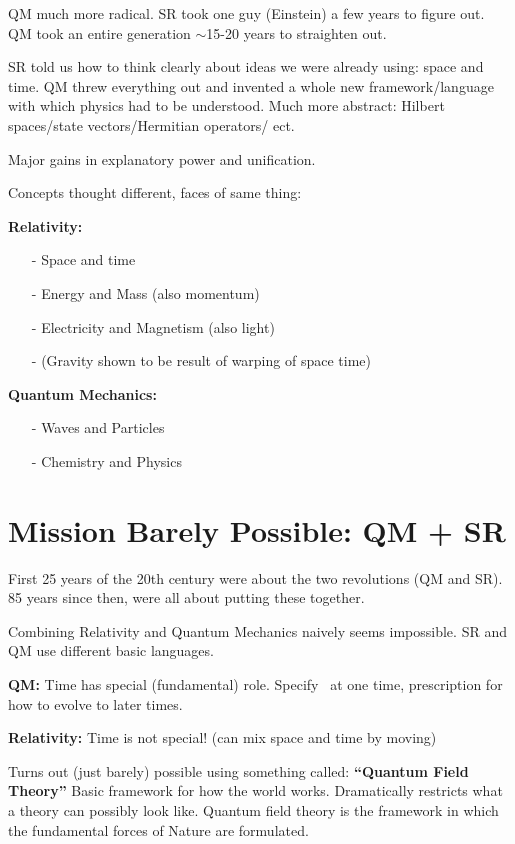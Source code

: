 {QM much more radical. 
SR took one guy (Einstein) a few years to figure out. 
QM took an entire generation $\sim$15-20 years to straighten out. 

SR told us how to think clearly about ideas we were already using: space and time. 
QM threw everything out and invented a whole new framework/language with which physics had to be understood.
Much more abstract: Hilbert spaces/state vectors/Hermitian operators/ ect.

Major gains in explanatory power and unification.

Concepts thought different, faces of same thing:

\textbf{Relativity:}
\begin{itemize}
\item[-] Space and time
\item[-] Energy and Mass (also momentum)
\item[-] Electricity and Magnetism (also light)
\item[-] (Gravity shown to be result of warping of space time)
\end{itemize}

\textbf{Quantum Mechanics:}
\begin{itemize}
\item[-] Waves and Particles
\item[-] Chemistry and Physics
\end{itemize}

\section{Mission Barely Possible: QM + SR}
First 25 years of the 20th century were about the two revolutions (QM and SR).
85 years since then, were all about putting these together.

Combining Relativity and Quantum Mechanics naively seems impossible. 
SR and QM use different basic languages. 

\textbf{QM:} Time has special (fundamental) role. Specify \ketY\ at one time, prescription for how to evolve to later times.

\textbf{Relativity:} Time is not special! (can mix space and time by moving)

Turns out (just barely) possible using something called: \textbf{``Quantum Field Theory'' }
Basic framework for how the world works.
Dramatically restricts what a theory can possibly look like.
Quantum field theory is the framework in which the fundamental forces of Nature are formulated.

}

